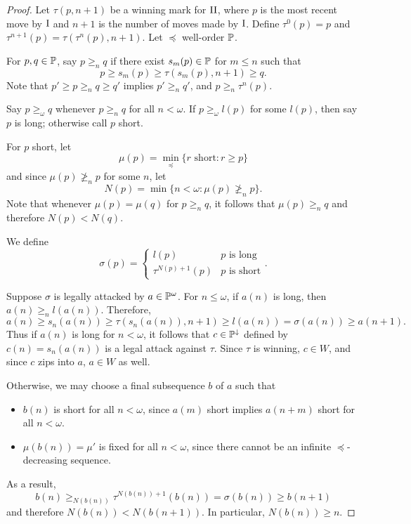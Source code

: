 \documentclass[11pt]{article}
\theoremstyle{plain}
\theoremstyle{definition}
\theoremstyle{remark}
\theoremstyle{plain}
\theoremstyle{definition}
\theoremstyle{remark}
\begin{document}
  \begin{proof}
    Let \(\tau(p,n+1)\) be a winning mark for \(\mathrm{II}\), where \(p\)
    is the most recent move by \(\mathrm{I}\) and \(n+1\)
    is the number of moves made by \(\mathrm{I}\).
    Define \(\tau^0(p)=p\) and \(\tau^{n+1}(p)=\tau(\tau^n(p),n+1)\).
    Let \(\preceq\) well-order \(\mathbb{P}\).

    For \(p,q\in \mathbb{P}\), say \(p\geq_n q\) if there exist
    \(s_m(p)\in\mathbb{P}\) for \(m\leq n\)
    such that
    \[
      p
    \geq
      s_m(p)
    \geq
      \tau(s_m(p),n+1)
    \geq
      q
    .\]
    Note that \(p'\geq p\geq_n q\geq q'\) implies \(p'\geq_n q'\),
    and \(p\geq_n \tau^n(p)\).

    Say \(p\geq_\omega q\) whenever \(p\geq_n q\) for all \(n<\omega\).
    If \(p\geq_\omega l(p)\) for some \(l(p)\), then say \(p\) is long;
    otherwise call \(p\) short.

    For \(p\) short, let
    \[
      \mu(p)
        =
      \min_{\preceq}\{
        r\text{ short}
          :
        r\geq p
      \}
    \]
    and since \(\mu(p)\not\geq_n p\) for some \(n\), let
    \[
      N(p)
        =
      \min\{
        n<\omega
      :
        \mu(p)\not\geq_n p
      \}
    .\]
    Note that whenever \(\mu(p)=\mu(q)\) for \(p\geq_n q\),
    it follows that \(\mu(p)\geq_n q\) and therefore \(N(p)<N(q)\).

    We define
    \[
      \sigma( p)
        =
      \begin{cases}
        l(p) & p \text{ is long} \\
        \tau^{N(p)+1}( p) &  p \text{ is short}
     \end{cases}
    .\]

    Suppose \(\sigma\) is legally attacked by \(a\in\mathbb{P}^\omega\).
    For \(n\leq\omega\), if \(a(n)\) is long, then \(a(n)\geq_n l(a(n))\).
    Therefore,
    \[
      a(n)
        \geq
      s_n(a(n))
        \geq
      \tau(s_n(a(n)),n+1)
        \geq
      l(a(n))
        =
      \sigma(a(n))
        \geq
      a(n+1)
    .\]
    Thus if \(a(n)\) is long for \(n<\omega\), it follows that
    \(c\in\mathbb{P}^\downarrow\) defined by \(c(n)=s_n(a(n))\)
    is a legal attack against \(\tau\). Since \(\tau\) is winning,
    \(c\in W\), and since \(c\) zips into \(a\),
    \(a\in W\) as well.

    Otherwise, we may choose a final subsequence \(b\) of \(a\) such that
      \begin{itemize}
        \item \(b(n)\) is short for all \(n<\omega\),
              since \(a(m)\) short implies \(a(n+m)\) short for all
              \(n<\omega\).
        \item \(\mu(b(n))=\mu'\) is fixed for all \(n<\omega\), since
              there cannot be an infinite \(\preceq\)-decreasing sequence.
      \end{itemize}
    As a result,
    \[
      b(n)
        \geq_{N(b(n))}
      \tau^{N(b(n))+1}(b(n))
        =
      \sigma(b(n))
        \geq
      b(n+1)
    \]
    and therefore \(N(b(n))<N(b(n+1))\). In particular, \(N(b(n))\geq n\).


\end{proof}
\end{document}
